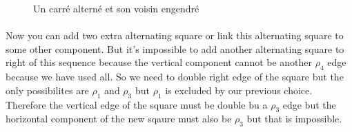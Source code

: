 \begin{figure}[H]
  \begin{center}
    \caption{Un carré alterné et son voisin engendré}
  \end{center}
\end{figure}

\paragraph{}
Now you can add two extra alternating square or link this alternating square to some other component. But it's impossible to add another alternating square to right of this sequence because the vertical component cannot be another $\rho_4$ edge because we have used all. So we need to double right edge of the square but the only possibilites are $\rho_1$ and $\rho_3$ but $\rho_1$ is excluded by our previous choice. Therefore the vertical edge of the square must be double bu a $\rho_3$ edge but the horizontal component of the new sqaure must also be $\rho_3$ but that is impossible.

